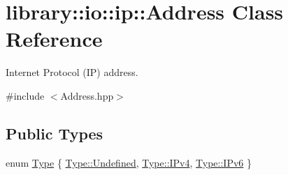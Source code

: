 \hypertarget{classlibrary_1_1io_1_1ip_1_1_address}{}\section{library\+:\+:io\+:\+:ip\+:\+:Address Class Reference}
\label{classlibrary_1_1io_1_1ip_1_1_address}


Internet Protocol (IP) address.  




{\ttfamily \#include $<$Address.\+hpp$>$}

\subsection*{Public Types}
\begin{DoxyCompactItemize}
\item 
enum \hyperlink{classlibrary_1_1io_1_1ip_1_1_address_a1a4f284eb6f5f52b67f2e34a93f225af}{Type} \{ \hyperlink{classlibrary_1_1io_1_1ip_1_1_address_a1a4f284eb6f5f52b67f2e34a93f225afaec0fc0100c4fc1ce4eea230c3dc10360}{Type\+::\+Undefined}, 
\hyperlink{classlibrary_1_1io_1_1ip_1_1_address_a1a4f284eb6f5f52b67f2e34a93f225afa42a9137a05a60eb752dcdf982e717626}{Type\+::\+I\+Pv4}, 
\hyperlink{classlibrary_1_1io_1_1ip_1_1_address_a1a4f284eb6f5f52b67f2e34a93f225afafdb7cb8f657426e7c409bfd6d1a36ce4}{Type\+::\+I\+Pv6}
 \}
\end{DoxyCompactItemize}
